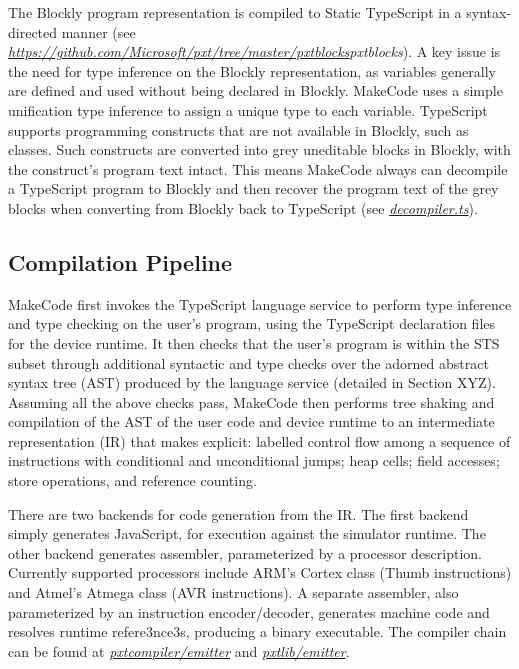 The Blockly program representation is compiled to Static TypeScript in a syntax-directed manner
(see \emph{\url{https://github.com/Microsoft/pxt/tree/master/pxtblocks}{pxtblocks}}). A key issue is the need for
type inference on the Blockly representation, as variables generally are defined and used without
being declared in Blockly. MakeCode uses a simple unification type inference to assign a
unique type to each variable.  
TypeScript supports programming constructs that are not available in Blockly, such as classes.
Such constructs are converted into grey uneditable blocks in Blockly, with the construct's program
text intact. This means MakeCode always can decompile a TypeScript program to Blockly and then recover
the program text of the grey blocks when converting from Blockly back to TypeScript
 (see \emph{\href{https://github.com/Microsoft/pxt/blob/master/pxtcompiler/emitter/decompiler.ts}{decompiler.ts}}). 

\subsection{Compilation Pipeline}

MakeCode first invokes the TypeScript language service to perform type inference and type checking on the 
user's program, using the TypeScript declaration files for the device runtime.   It then checks that the
user's program is within the STS subset through additional syntactic and type checks over the adorned
abstract syntax tree (AST) produced by the language service (detailed in Section XYZ).  Assuming all the
above checks pass, MakeCode then performs tree shaking and compilation of the AST of the user code and
device runtime to an intermediate representation (IR) that makes explicit: labelled control flow among a
sequence of instructions with conditional and unconditional jumps; heap cells; field accesses; store operations,
and reference counting.

There are two backends for code generation from the IR. The first backend simply generates JavaScript,
for execution against the simulator runtime.  The other backend generates assembler, parameterized by a
processor description.  Currently supported processors include ARM's Cortex class (Thumb instructions)
and Atmel's Atmega class (AVR instructions). A separate assembler, also parameterized by an instruction
encoder/decoder, generates machine code and resolves runtime refere3nce3s, producing a binary executable. 
The compiler chain
can be found at \emph{\href{https://github.com/Microsoft/pxt/tree/master/pxtcompiler/emitter}{pxtcompiler/emitter}} and 
\emph{\href{https://github.com/Microsoft/pxt/tree/master/pxtlib/emitter}{pxtlib/emitter}}.

